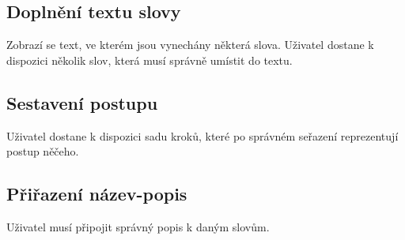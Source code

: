 \documentclass[a4paper,12pt]{article}
\begin{document}
\subsection{Doplnění textu slovy}
Zobrazí se text, ve kterém jsou vynechány některá slova. Uživatel dostane k dispozici několik slov, která musí správně umístit do textu.
\begin{figure}[H]
\end{figure}
\subsection{Sestavení postupu}
Uživatel dostane k dispozici sadu kroků, které po správném seřazení reprezentují postup něčeho.
\begin{figure}[H]
\end{figure}
\subsection{Přiřazení název-popis}
Uživatel musí připojit správný popis k daným slovům.
\begin{figure}[H]
\end{figure}
\end{document}
